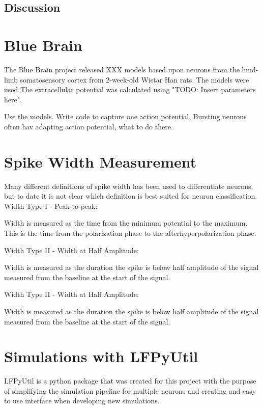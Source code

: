 \documentclass[altfont, fleqn]{uiophd}
\begin{document}
\subsection{Discussion}

\section{Blue Brain}
The Blue Brain project released XXX models based upon neurons from 
the hind-limb somatosensory cortex
from 2-week-old Wistar Han rats.
The models were used
The extracellular potential was calculated using 
"TODO: Insert parameters here". 

Use the models. Write code to capture one action potential. Bursting neurons
often hav adapting action potential, what to do there. 

\section{Spike Width Measurement}
Many different definitions of spike width has been used to differentiate neurons, but
to date it is not clear which definition is best suited for neuron classification. 
\\

\noindent 
Width Type I - Peak-to-peak: 

Width is measured as the time from the minimum potential to the maximum. 
This is the time from the polarization phase to the afterhyperpolarization phase. 
\newline

\noindent
Width Type II - Width at Half Amplitude:

Width is measured as the duration the spike is below half amplitude of the signal measured
from the baseline at the start of the signal. 
\newline

\noindent
Width Type II - Width at Half Amplitude:

Width is measured as the duration the spike is below half amplitude of the signal measured
from the baseline at the start of the signal. 
\newline

\section{Simulations with LFPyUtil}
LFPyUtil is a python package that was created for this project with the purpose
of simplifying the simulation pipeline for multiple neurons and creating
and easy to use interface when developing new simulations.
\end{document}
